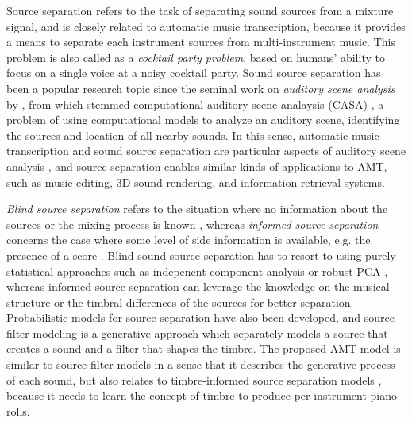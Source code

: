 Source separation refers to the task of separating sound sources from a mixture signal, and is closely related to automatic music transcription, because it provides a means to separate each instrument sources from multi-instrument music.
This problem is also called as a \emph{cocktail party problem}, based on humans' ability to focus on a single voice at a noisy cocktail party.
Sound source separation has been a popular research topic since the seminal work on \emph{auditory scene analysis} by , from which stemmed computational auditory scene analaysis (CASA) \cite{brown1994casa}, a problem of using computational models to analyze an auditory scene, identifying the sources and location of all nearby sounds.
In this sense, automatic music transcription and sound source separation are particular aspects of auditory scene analysis \cite{plumbley2002transcription}, and source separation enables similar kinds of applications to AMT, such as music editing, 3D sound rendering, and information retrieval systems.


\emph{Blind source separation} refers to the situation where no information about the sources or the mixing process is known \cite{bell1995blind}, whereas \emph{informed source separation} \cite{vincent2013separation} concerns the case where some level of side information is available, e.g. the presence of a score \cite{ewert2014separation}.
Blind sound source separation has to resort to using purely statistical approaches such as indepenent component analysis \cite{saruwatari2006ica} or robust PCA \cite{huang2012separation}, whereas informed source separation can leverage the knowledge on the musical structure \cite{rafii2013separation, liutkus2012separation} or the timbral differences of the sources \cite{li2007separation,ono2010hpss} for better separation.
Probabilistic models for source separation \cite{ozerov2007separation,leglaive2016prior} have also been developed, and source-filter modeling \cite{heittola2009separation,durrieu2011separation} is a generative approach which separately models a source that creates a sound and a filter that shapes the timbre.
The proposed AMT model is similar to source-filter models in a sense that it describes the generative process of each sound, but also relates to timbre-informed source separation models \cite{miron2018thesis}, because it needs to learn the concept of timbre to produce per-instrument piano rolls.



